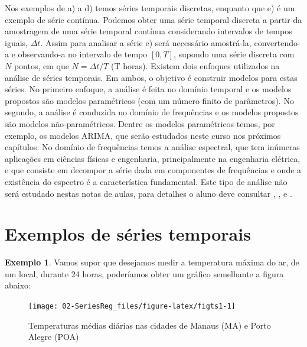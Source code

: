 \documentclass[
]{book}
\theoremstyle{definition}
\theoremstyle{definition}
\newtheorem{example}{Exemplo}[chapter]
\theoremstyle{definition}
\theoremstyle{remark}
\begin{document}
Nos exemplos de a) a d) temos séries temporais discretas, enquanto que e) é um exemplo de série contínua. Podemos obter uma série temporal discreta a partir da amostragem de uma série temporal contínua considerando intervalos de tempos iguais, \(\Delta t\). Assim para analisar a série e) será necessário amostrá-la, convertendo-a e observando-a no intervalo de tempo \([0,T]\), supondo uma série discreta com \(N\)
pontos, em que \(N = \Delta t/T\) (T horas). Existem dois enfoques utilizados na análise de séries temporais. Em ambos, o objetivo é construir modelos para estas séries. No primeiro enfoque, a análise é feita no domínio temporal e os modelos propostos são modelos paramétricos (com um número finito de parâmetros). No segundo, a análise é conduzida no domínio de frequências e os modelos propostos são modelos não-paramétricos. Dentre os modelos paramétricos temos, por exemplo, os modelos ARIMA, que serão estudados neste curso nos próximos capítulos. No domínio de frequências temos a análise espectral, que tem inúmeras aplicações em ciências físicas e engenharia, principalmente na engenharia elétrica, e que consiste em decompor a série dada em componentes de frequências e onde a existência do espectro é a característica fundamental. Este tipo de análise não será estudado nestas notas de aulas, para detalhes o aluno deve consultar \citet{watts1968}, \citet{koopmans1974}, \citet{morettin1978} e \citet{marple1980}.

\hypertarget{exemplos-de-suxe9ries-temporais}{%
\section{Exemplos de séries temporais}\label{exemplos-de-suxe9ries-temporais}}

\begin{example}
\protect\hypertarget{exm:exemptemp}{}{\label{exm:exemptemp} }Vamos supor que desejamos medir a temperatura máxima do ar, de um local,
durante 24 horas, poderíamos obter um gráfico semelhante a figura abaixo:
\end{example}

\begin{figure}

{\centering \texttt{[image: 02-SeriesReg\_files/figure-latex/figts1-1]} 

}

\caption{Temperaturas médias diárias nas cidades de Manaus (MA) e Porto Alegre (POA)}\label{fig:figts1}
\end{figure}
\end{document}
